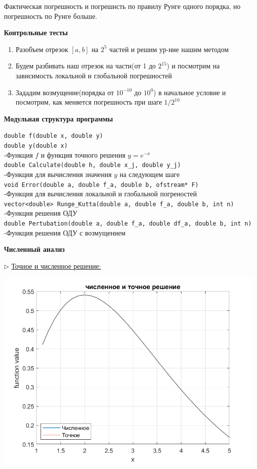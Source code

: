 \documentclass{article}
\begin{document}
	Фактическая погрешность и погрешнсть по правилу Рунге одного порядка, но погрешность по Рунге больше.
	\begin{center} \textbf{Контрольные тесты}\end{center}
	\begin{enumerate}
		\item Разобъем отрезок $[a,b]$ на $2^5$ частей и решим ур-ние нашим методом
		\item Будем разбивать наш отрезок на части(от 1 до $2^{15}$) и посмотрим на зависимость локальной и глобальной погрешностей
		\item Зададим возмущение(порядка от $10^{-10}$ до $10^0$) в начальное условие и посмотрим, как меняется погрешность при шаге $1/2^{10}$
	\end{enumerate}
	\begin{center} \textbf{Модульная структура программы}\end{center}
	\verb|double f(double x, double y)|\\
	\verb|double y(double x)|\\
	-Функция $f$ и функция точного решения $y = e^{-x}$\\
	\verb|double Calculate(double h, double x_j, double y_j)|\\
	-Функция для вычисления значения $y$ на следующем шаге\\
	\verb|void Error(double a, double f_a, double b, ofstream* F)|\\
	-Функция для вычисления локальной и глобальной погреностей\\
	\verb|vector<double> Runge_Kutta(double a, double f_a, double b, int n)|\\
	-Функция решения ОДУ\\
	\verb|double Pertubation(double a, double f_a, double df_a, double b, int n)|\\
	-Функция решения ОДУ с возмущением
	\newpage
	\begin{center} \textbf{Численный анализ}\end{center}
	$\triangleright$ \underline{Точное и численное решение:}\
	\begin{center} \includegraphics[scale = 0.6]{решение} \end{center}
\end{document}
